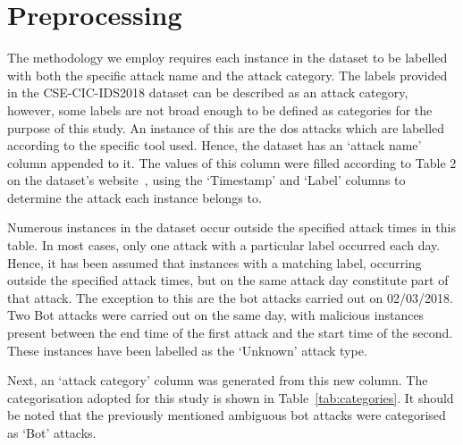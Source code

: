 \section{Preprocessing}%
\label{sec:preprocessing}

The methodology we employ requires each instance in the dataset to be labelled
with both the specific attack name and the attack category. The labels provided
in the CSE-CIC-IDS2018 dataset can be described as an attack category, however,
some labels are not broad enough to be defined as categories for the purpose of
this study. An instance of this are the \gls{dos} attacks which are labelled
according to the specific tool used. Hence, the dataset has an `attack name'
column appended to it. The values of this column were filled according to Table
2 on the dataset's website~\cite{cic2018}, using the `Timestamp' and `Label'
columns to determine the attack each instance belongs to.

Numerous instances in the dataset occur outside the specified attack times in
this table. In most cases, only one attack with a particular label occurred
each day. Hence, it has been assumed that instances with a matching label,
occurring outside the specified attack times, but on the same attack day
constitute part of that attack. The exception to this are the bot attacks
carried out on 02/03/2018. Two Bot attacks were carried out on the same day,
with malicious instances present between the end time of the first attack and
the start time of the second. These instances have been labelled as the
`Unknown' attack type.

Next, an `attack category' column was generated from this new column. The
categorisation adopted for this study is shown in Table~\ref{tab:categories}.
It should be noted that the previously mentioned ambiguous bot attacks were
categorised as `Bot' attacks.

